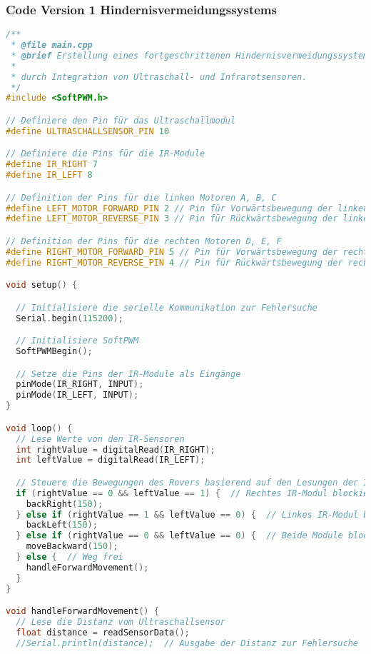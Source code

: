 \documentclass{vorlage-design-main}
\begin{document}
\newpage

\hypertarget{code-version-1-hindernisvermeidungssystems}{%
\subsubsection{Code Version 1
Hindernisvermeidungssystems}\label{code-version-1-hindernisvermeidungssystems}}

\begin{lstlisting}[language={C++}]
/**
 * @file main.cpp
 * @brief Erstellung eines fortgeschrittenen Hindernisvermeidungssystems
 * 
 * durch Integration von Ultraschall- und Infrarotsensoren.
 */
#include <SoftPWM.h>

// Definiere den Pin für das Ultraschallmodul
#define ULTRASCHALLSENSOR_PIN 10

// Definiere die Pins für die IR-Module
#define IR_RIGHT 7
#define IR_LEFT 8

// Definition der Pins für die linken Motoren A, B, C
#define LEFT_MOTOR_FORWARD_PIN 2 // Pin für Vorwärtsbewegung der linken Motoren (A, B, C)
#define LEFT_MOTOR_REVERSE_PIN 3 // Pin für Rückwärtsbewegung der linken Motoren (A, B, C)

// Definition der Pins für die rechten Motoren D, E, F
#define RIGHT_MOTOR_FORWARD_PIN 5 // Pin für Vorwärtsbewegung der rechten Motoren (D, E, F)
#define RIGHT_MOTOR_REVERSE_PIN 4 // Pin für Rückwärtsbewegung der rechten Motoren (D, E, F)

void setup() {

  // Initialisiere die serielle Kommunikation zur Fehlersuche
  Serial.begin(115200);

  // Initialisiere SoftPWM
  SoftPWMBegin();

  // Setze die Pins der IR-Module als Eingänge
  pinMode(IR_RIGHT, INPUT);
  pinMode(IR_LEFT, INPUT);
}

void loop() {
  // Lese Werte von den IR-Sensoren
  int rightValue = digitalRead(IR_RIGHT);
  int leftValue = digitalRead(IR_LEFT);

  // Steuere die Bewegungen des Rovers basierend auf den Lesungen der IR-Sensoren
  if (rightValue == 0 && leftValue == 1) {  // Rechtes IR-Modul blockiert
    backRight(150);
  } else if (rightValue == 1 && leftValue == 0) {  // Linkes IR-Modul blockiert
    backLeft(150);
  } else if (rightValue == 0 && leftValue == 0) {  // Beide Module blockiert
    moveBackward(150);
  } else {  // Weg frei
    handleForwardMovement();
  }
}

void handleForwardMovement() {
  // Lese die Distanz vom Ultraschallsensor
  float distance = readSensorData();
  //Serial.println(distance);  // Ausgabe der Distanz zur Fehlersuche


\end{lstlisting}
\end{document}
